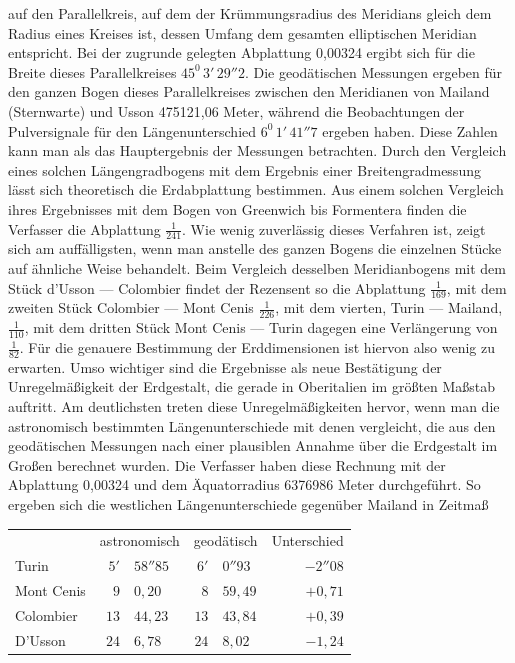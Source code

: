 %
auf den Parallelkreis, auf dem der Krümmungsradius des Meridians gleich dem Radius eines Kreises ist, dessen Umfang dem gesamten elliptischen Meridian entspricht. Bei der zugrunde gelegten Abplattung 0,00324 ergibt sich für die Breite dieses Parallelkreises \(45^0\,3'\,29''2\). Die geodätischen Messungen ergeben für den ganzen Bogen dieses Parallelkreises zwischen den Meridianen von Mailand (Sternwarte) und Usson 475121,06 Meter, während die Beobachtungen der Pulversignale für den Längenunterschied \(6^0\,1'\,41''7\) ergeben haben. Diese Zahlen kann man als das Hauptergebnis der Messungen betrachten. Durch den Vergleich eines solchen Längengradbogens mit dem Ergebnis einer Breitengradmessung lässt sich theoretisch die Erdabplattung bestimmen. Aus einem solchen Vergleich ihres Ergebnisses mit dem Bogen von Greenwich bis Formentera finden die Verfasser die Abplattung \(\frac{1}{241}\). Wie wenig zuverlässig dieses Verfahren ist, zeigt sich am auffälligsten, wenn man anstelle des ganzen Bogens die einzelnen Stücke auf ähnliche Weise behandelt. Beim Vergleich desselben Meridianbogens mit dem Stück d’Usson --- Colombier findet der Rezensent so die Abplattung \(\frac{1}{169}\), mit dem zweiten Stück Colombier --- Mont Cenis \(\frac{1}{226}\), mit dem vierten, Turin --- Mailand, \(\frac{1}{110}\), mit dem dritten Stück Mont Cenis --- Turin dagegen eine Verlängerung von \(\frac{1}{82}\). Für die genauere Bestimmung der Erddimensionen ist hiervon also wenig zu erwarten. Umso wichtiger sind die Ergebnisse als neue Bestätigung der Unregelmäßigkeit der Erdgestalt, die gerade in Oberitalien im größten Maßstab auftritt. Am deutlichsten treten diese Unregelmäßigkeiten hervor, wenn man die astronomisch bestimmten Längenunterschiede mit denen vergleicht, die aus den geodätischen Messungen nach einer plausiblen Annahme über die Erdgestalt im Großen berechnet wurden. Die Verfasser haben diese Rechnung mit der Abplattung 0,00324 und dem Äquatorradius 6376986 Meter durchgeführt. So ergeben sich die westlichen Längenunterschiede gegenüber Mailand in Zeitmaß
\begin{center}
\begin{tabular}{l|r@{\quad}l|r@{\quad}l|r}
&\multicolumn{2}{c|}{astronomisch}&\multicolumn{2}{c|}{geodätisch}&Unterschied\\
Turin & \(5'\) & \(58''85\) & \(6'\) & \(0''93\) & \(-2''08\)\\
Mont Cenis & \(9\) & \(0,20\) & \(8\) & \(59,49\) & \(+0,71\)\\
Colombier & \(13\) & \(44,23\) & \(13\) & \(43,84\) & \(+0,39\)\\
D’Usson & \(24\) & \(6,78\) & \(24\) & \(8,02\) & \(-1,24\)
\end{tabular}
\end{center}
